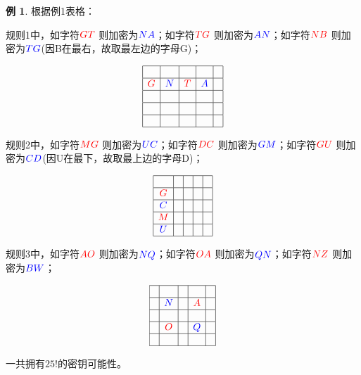 \documentclass{article}
\theoremstyle{definition}
\newtheorem{example}{\indent 例}
\begin{document}
\begin{example}


根据例1表格：


规则1中，如字符${\color{red}GT}$ 则加密为${\color{blue}NA}$；如字符${\color{red}TG}$ 则加密为${\color{blue}AN}$；如字符${\color{red}NB}$ 则加密为${\color{blue}TG}$(因B在最右，故取最左边的字母G)；

$$
\begin{array}{|c|c|c|c|c|}
\hline &  & &   &   \\
\hline {\color{red}G} &  {\color{blue}N} &  {\color{red}T} & {\color{blue}A} &  \\
\hline &  & &   &   \\
\hline &  & &   &   \\
\hline &  & &   &   \\
\hline
\end{array}
$$

 
规则2中，如字符${\color{red}MG}$ 则加密为${\color{blue}UC}$；如字符${\color{red}DC}$ 则加密为${\color{blue}GM}$；如字符${\color{red}GU}$ 则加密为${\color{blue}CD}$(因U在最下，故取最上边的字母D)；

$$
\begin{array}{|c|c|c|c|c|}
\hline &  & &   &   \\
\hline {\color{red}G}&  & &   &   \\
\hline {\color{blue}C}&  & &   &   \\
\hline {\color{red}M}&  & &   &   \\
\hline {\color{blue}U}&  & &   &   \\
\hline
\end{array}
$$

规则3中，如字符${\color{red}AO}$ 则加密为${\color{blue}NQ}$；如字符${\color{red}OA}$ 则加密为${\color{blue}QN }$；如字符${\color{red}NZ}$ 则加密为${\color{blue}BW}$；
 
$$
\begin{array}{|c|c|c|c|c|}
\hline  &  & &   &   \\
\hline  & {\color{blue}N} & & {\color{red}A}  & \\
\hline  &  & &   &  \\
\hline  & {\color{red}O} & &  {\color{blue}Q} &  \\
\hline  &  & &   &  \\
\hline
\end{array}
$$


一共拥有$25!$的密钥可能性。

\end{example}
\end{document}
